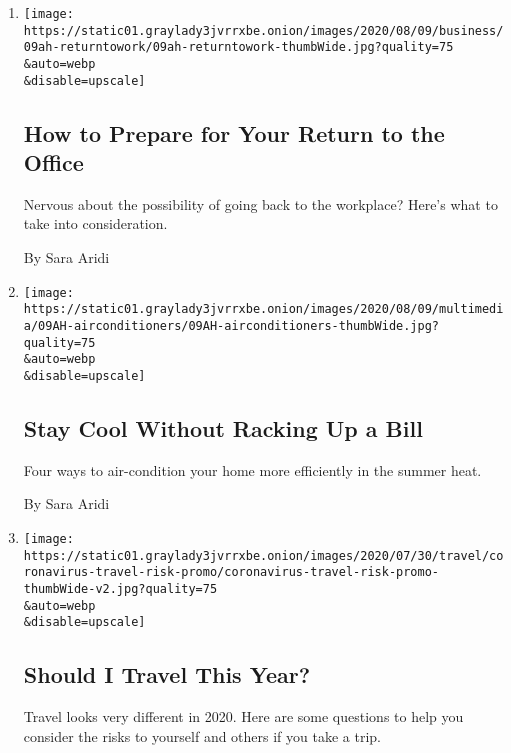 \begin{enumerate}
\def\labelenumi{\arabic{enumi}.}
\item
  \href{/2020/08/08/at-home/office-return-coronavirus.html}{}

  \texttt{[image: https://static01.graylady3jvrrxbe.onion/images/2020/08/09/business/09ah-returntowork/09ah-returntowork-thumbWide.jpg?quality=75\\\&auto=webp\\\&disable=upscale]}

  \hypertarget{how-to-prepare-for-your-return-to-the-office}{%
  \subsection{How to Prepare for Your Return to the
  Office}\label{how-to-prepare-for-your-return-to-the-office}}

  Nervous about the possibility of going back to the workplace? Here's
  what to take into consideration.

  By Sara Aridi
\item
  \href{/2020/08/08/at-home/lower-air-conditioning-bill.html}{}

  \texttt{[image: https://static01.graylady3jvrrxbe.onion/images/2020/08/09/multimedia/09AH-airconditioners/09AH-airconditioners-thumbWide.jpg?quality=75\\\&auto=webp\\\&disable=upscale]}

  \hypertarget{stay-cool-without-racking-up-a-bill}{%
  \subsection{Stay Cool Without Racking Up a
  Bill}\label{stay-cool-without-racking-up-a-bill}}

  Four ways to air-condition your home more efficiently in the summer
  heat.

  By Sara Aridi
\item
  \href{/interactive/2020/07/31/travel/coronavirus-travel-risk.html}{}

  \texttt{[image: https://static01.graylady3jvrrxbe.onion/images/2020/07/30/travel/coronavirus-travel-risk-promo/coronavirus-travel-risk-promo-thumbWide-v2.jpg?quality=75\\\&auto=webp\\\&disable=upscale]}

  \hypertarget{should-i-travel-this-year}{%
  \subsection{Should I Travel This
  Year?}\label{should-i-travel-this-year}}

  Travel looks very different in 2020. Here are some questions to help
  you consider the risks to yourself and others if you take a trip.


\end{enumerate}
